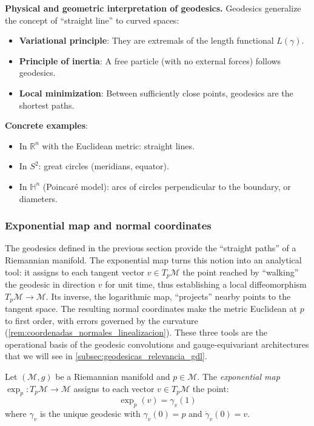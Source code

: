 \textbf{Physical and geometric interpretation of geodesics.}\label{rem:interpretacion_geodesicas} Geodesics generalize the concept of ``straight line'' to curved spaces:
\begin{itemize}
	\item \textbf{Variational principle}: They are extremals of the length functional $L(\gamma)$.
	\item \textbf{Principle of inertia}: A free particle (with no external forces) follows geodesics.
	\item \textbf{Local minimization}: Between sufficiently close points, geodesics are the shortest paths.
\end{itemize}

\textbf{Concrete examples}:
\begin{itemize}
	\item In $\mathbb{R}^n$ with the Euclidean metric: straight lines.
	\item In $S^2$: great circles (meridians, equator).
	\item In $\mathbb{H}^n$ (Poincaré model): arcs of circles perpendicular to the boundary, or diameters.
\end{itemize}

\subsubsection{Exponential map and normal coordinates}\label{subsec:mapa_exponencial}

The geodesics defined in the previous section provide the ``straight paths'' of a Riemannian manifold. The exponential map turns this notion into an analytical tool: it assigns to each tangent vector $v \in T_p\mathcal{M}$ the point reached by ``walking'' the geodesic in direction $v$ for unit time, thus establishing a local diffeomorphism $T_p\mathcal{M} \to \mathcal{M}$. Its inverse, the logarithmic map, ``projects'' nearby points to the tangent space. The resulting normal coordinates make the metric Euclidean at $p$ to first order, with errors governed by the curvature (\autoref{rem:coordenadas_normales_linealizacion}). These three tools are the operational basis of the geodesic convolutions and gauge-equivariant architectures that we will see in \autoref{subsec:geodesicas_relevancia_gdl}.

\begin{definition}\label{def:mapa_exponencial_riemanniano}
Let $(\mathcal{M}, g)$ be a Riemannian manifold and $p \in \mathcal{M}$. The \textit{exponential map} $\exp_p: T_p\mathcal{M} \to \mathcal{M}$ assigns to each vector $v \in T_p\mathcal{M}$ the point:
\[
\exp_p(v) = \gamma_v(1)
\]
where $\gamma_v$ is the unique geodesic with $\gamma_v(0) = p$ and $\dot{\gamma}_v(0) = v$.
\end{definition}

